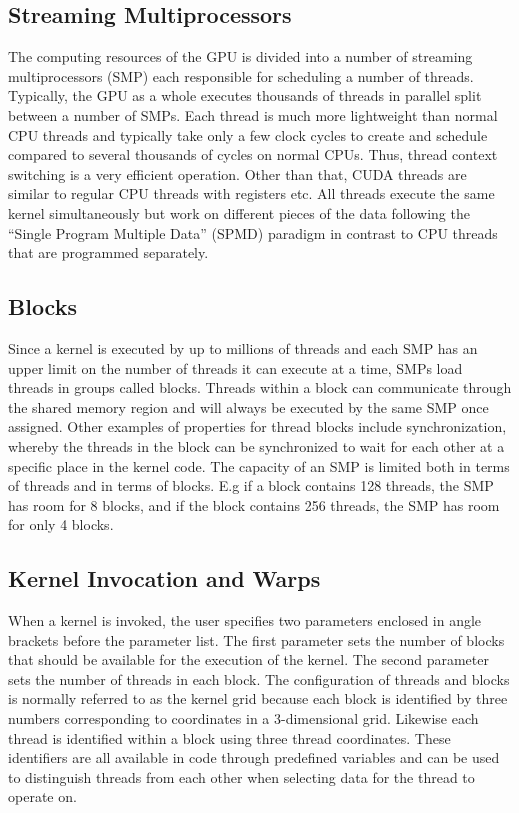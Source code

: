 \subsection{Streaming Multiprocessors}
The computing resources of the GPU is divided into a number of streaming multiprocessors (SMP) each responsible for scheduling a number of threads. Typically, the GPU as a whole executes thousands of threads in parallel split between a number of SMPs. Each thread is much more lightweight than normal CPU threads and typically take only a few clock cycles to create and schedule compared to several thousands of cycles on normal CPUs. Thus, thread context switching is a very efficient operation. Other than that, CUDA threads are similar to regular CPU threads with registers etc. All threads execute the same kernel simultaneously but work on different pieces of the data following the ``Single Program Multiple Data'' (SPMD) paradigm in contrast to CPU threads that are programmed separately. \\

\subsection{Blocks}
Since a kernel is executed by up to millions of threads and each SMP has an upper limit on the number of threads it can execute at a time, SMPs load threads in groups called blocks. Threads within a block can communicate through the shared memory region and will always be executed by the same SMP once assigned. Other examples of properties for thread blocks include synchronization, whereby the threads in the block can be synchronized to wait for each other at a specific place in the kernel code. The capacity of an SMP is limited both in terms of threads and in terms of blocks. E.g if a block contains 128 threads, the SMP has room for 8 blocks, and if the block contains 256 threads, the SMP has room for only 4 blocks.

\subsection{Kernel Invocation and Warps}
\label{sec:kernelandwarps}
When a kernel is invoked, the user specifies two parameters enclosed in angle brackets before the parameter list. The first parameter sets the number of blocks that should be available for the execution of the kernel. The second parameter sets the number of threads in each block. The configuration of threads and blocks is normally referred to as the kernel grid because each block is identified by three numbers corresponding to coordinates in a 3-dimensional grid. Likewise each thread is identified within a block using three thread coordinates. These identifiers are all available in code through predefined variables and can be used to distinguish threads from each other when selecting data for the thread to operate on.\\

